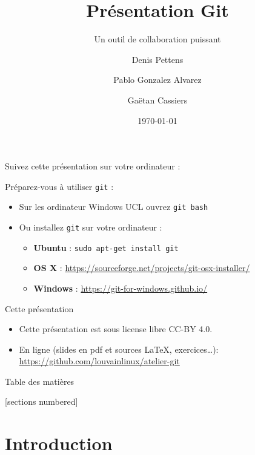 \documentclass{beamer}
\title{Présentation Git}
\subtitle{Un outil de collaboration puissant}
\date{\today}
\author{Denis Pettens \and Pablo Gonzalez Alvarez \and Gaëtan Cassiers}
\institute{Louvain-li-Nux}
\begin{document}
\begin{frame}
\begin{center}
  Suivez cette présentation sur votre ordinateur :

\end{center}

Préparez-vous à utiliser \texttt{git} :
\begin{itemize}
    \item Sur les ordinateur Windows UCL ouvrez \texttt{git bash}
    \item Ou installez \texttt{git} sur votre ordinateur :
    \begin{itemize}
        \item \textbf{Ubuntu} : \lstinline{sudo apt-get install git}
        \item \textbf{OS X} : \url{https://sourceforge.net/projects/git-osx-installer/}
        \item \textbf{Windows} : \url{https://git-for-windows.github.io/}
    \end{itemize}
\end{itemize}
\end{frame}

\maketitle

\begin{frame}{Cette présentation}
    \begin{itemize}
        \item Cette présentation est sous license libre CC-BY 4.0.
        \item En ligne (slides en pdf et sources \LaTeX, exercices\ldots):
            \url{https://github.com/louvainlinux/atelier-git}
    \end{itemize}
\end{frame}

\begin{frame}{Table des matières}

[sections numbered]
\tableofcontents[hideallsubsections]

\end{frame}

\section{Introduction}
\end{document}
